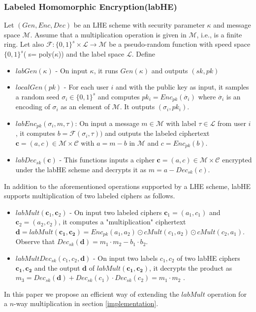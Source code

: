 \subsubsection{Labeled Homomorphic Encryption(\textsf{labHE})}
Let $(Gen,Enc,Dec)$ be an \textsf{LHE} scheme with security parameter $\kappa$ and message space $\mathcal{M}$. Assume that a multiplication operation is given in $\mathcal{M}$, i.e., is a finite ring. Let also $\mathcal{F}:\{0,1\}^s \times \mathcal{L}\rightarrow \mathcal{M}$ be a pseudo-random function with speed space $\{0,1\}^s$( s= poly($\kappa $)) and the label space $\mathcal{L}$. Define
\begin{itemize}
\item $labGen(\kappa)$ - On input $\kappa$, it runs $Gen(\kappa)$ and outputs $(sk,pk)$
\item $localGen(pk)$ -  For each user $i$ and with the public key as input, it samples a random seed $\sigma_i \in \{0,1\}^s$ and computes $pk_i = Enc_{pk}(\ddot{\sigma_i})$ where $\ddot{\sigma_i}$ is an  encoding of $\sigma_i$ as an  element of $\mathcal{M}$. It outputs $(\sigma_i,pk_i)$.
\item $labEnc_{pk}(\sigma_i, m , \tau)$: On input a message $m \in \mathcal{M} $ with label $\tau \in \mathcal{L}$  from user $i$, it computes $b=\mathcal{F}(\sigma_i, \tau))$ and outputs the labeled ciphertext $\mathbf{c}=(a,c) \in \mathcal{M} \times \mathcal{C}$ with $ a= m- b$ in $\mathcal{M}$ and $c=Enc_{pk}(b)$.
\item $labDec_{sk}(\mathbf{c})$ - This functions inputs a cipher $\mathbf{c}=(a,c) \in \mathcal{M} \times \mathcal{C}$ encrypted under the labHE scheme and decrypts it as $m=a-Dec_{sk}(c)$.
\end{itemize}
In addition to the aforementioned operations supported by a \textsf{LHE}  scheme, \textsf{labHE} supports multiplication of two labeled ciphers as follows.
\begin{itemize}\item $labMult(\mathbf{c}_1,\mathbf{c}_2)$ -
On input two labeled ciphers $\mathbf{c}_1=(a_1,c_1)$ and $\mathbf{c}_2=(a_2,c_2)$, it computes a "multiplication" ciphertext $\mathbf{d}=labMult(\mathbf{c_1,c_2})=Enc_{pk}(a_1,a_2)\odot cMult(c_1,a_2) \odot cMult(c_2,a_1)$. Observe that $Dec_{sk}(\mathbf{d})=m_1\cdot m_2 -b_1 \cdot b_2$.
\item $labMultDec_{sk}(c_1,c_2,\mathbf{d})$ - On input two labels $c_1,c_2$ of two labHE ciphers $\mathbf{c_1},\mathbf{c_2}$ and the output $\mathbf{d}$ of $labMult(\mathbf{c_1},\mathbf{c_2})$, it decrypts the product as $m_3=Dec_{sk}(\mathbf{d})+Dec_{sk}(c_1)\cdot Dec_{sk}(c_2) = m_1\cdot m_2$ .    \end{itemize}
In this paper we propose an efficient way of extending the $labMult$ operation for a $n$-way multiplication in section \ref{implementation}.
